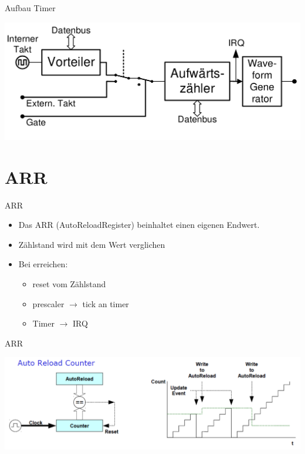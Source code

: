 \documentclass[aspectratio=169,presentation]{beamer}
\begin{document}
\begin{frame}{Aufbau Timer}
  \begin{center}
    \includegraphics[width=\textwidth]{timer_generell}
  \end{center}
\end{frame}

\section{ARR}
\begin{frame}{ARR}
  \begin{itemize}
    \item Das ARR (AutoReloadRegister) beinhaltet einen eigenen Endwert.
    \item Zählstand wird mit dem Wert verglichen
    \item Bei erreichen:
    \begin{itemize}
      \item reset vom Zählstand
      \item prescaler $\rightarrow$ tick an timer
      \item Timer $\rightarrow$ IRQ
    \end{itemize}
  \end{itemize}
\end{frame}

\begin{frame}{ARR}
  \begin{center}
    \includegraphics[width=\textwidth]{ARPE_disable}    
  \end{center}
\end{frame}
\end{document}
